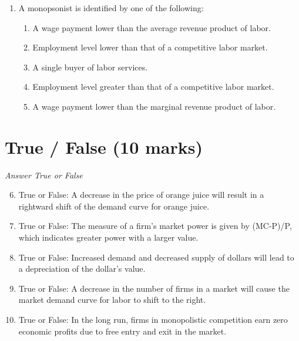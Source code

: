 \documentclass[12pt]{article}
\begin{document}
\begin{enumerate}[label=\arabic*.]
\begin{enumerate}[label=(\alph*)]
    \item k x T
    \item T x k
    \item T x k x 1
    \item T x T
    \item 1 x 1
\end{enumerate}
\item A monopsonist is identified by one of the following:
\begin{enumerate}[label=(\alph*)]
    \item A wage payment lower than the average revenue product of labor.
    \item Employment level lower than that of a competitive labor market.
    \item A single buyer of labor services.
    \item Employment level greater than that of a competitive labor market.
    \item A wage payment lower than the marginal revenue product of labor.
\end{enumerate}
\end{enumerate}

\section*{True / False (10 marks)}
\textit{Answer True or False}
\begin{enumerate}[label=\arabic*.]
\setcounter{enumi}{5}
\item True or False: A decrease in the price of orange juice will result in a rightward shift of the demand curve for orange juice.
\item True or False: The measure of a firm's market power is given by (MC-P)/P, which indicates greater power with a larger value.
\item True or False: Increased demand and decreased supply of dollars will lead to a depreciation of the dollar's value.
\item True or False: A decrease in the number of firms in a market will cause the market demand curve for labor to shift to the right.
\item True or False: In the long run, firms in monopolistic competition earn zero economic profits due to free entry and exit in the market.
\end{enumerate}
\end{document}
